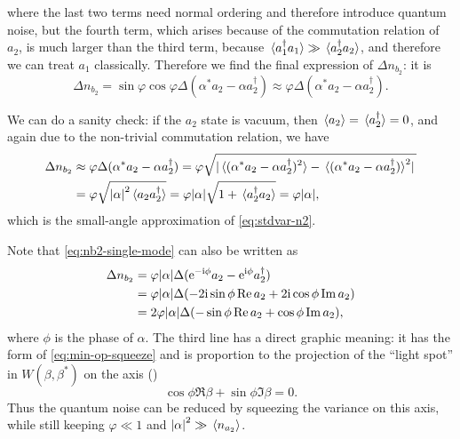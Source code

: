\documentclass[hyperref, a4paper]{article}
\newcommand*{\ii}{\mathrm{i}}
\newcommand*{\ee}{\mathrm{e}}
\begin{document}
where the last two terms need normal ordering and therefore introduce quantum noise,
but the fourth term, which arises because of the commutation relation of $a_2$, 
is much larger than the third term,
because $\expval*{a_1^\dagger a_1} \gg \expval*{a_2^\dagger a_2}$,
and therefore we can treat $a_1$ classically.
Therefore we find the final expression of $\Delta n_{b_2}$: 
it is 
\begin{equation}
    \Delta n_{b_2} = \sin \varphi \cos \varphi \Delta (\alpha^* a_2 - \alpha a_2^\dagger)
    \approx \varphi \Delta (\alpha^* a_2 - \alpha a_2^\dagger).
    \label{eq:nb2-single-mode}
\end{equation}

We can do a sanity check:
if the $a_2$ state is vacuum,
then $\expval*{a_2} = \expval*{a_2^\dagger} = 0$, 
and again due to the non-trivial commutation relation, we have 
\begin{equation}
    \begin{aligned}
        \Delta n_{b_2} &\approx \varphi \Delta (\alpha^* a_2 - \alpha a_2^\dagger)
        = \varphi \sqrt{ \abs*{\expval*{ (\alpha^* a_2 - \alpha a_2^\dagger)^2 } 
        - \expval*{(\alpha^* a_2 - \alpha a_2^\dagger)}^2} } \\
        &= \varphi \sqrt{
            \abs{\alpha}^2 \expval*{a_2 a_2^\dagger}
        } 
        = \varphi \abs{\alpha} \sqrt{ 1 + \expval*{a^\dagger_2 a_2} } = \varphi \abs{\alpha},
    \end{aligned}
\end{equation}
which is the small-angle approximation of \eqref{eq:stdvar-n2}.

Note that \eqref{eq:nb2-single-mode} can also be written as  
\begin{equation}
    \begin{aligned}
        \Delta n_{b_2} &= \varphi \abs{\alpha} \Delta (\ee^{- \ii \phi} a_2 - \ee^{\ii \phi} a_2^\dagger)  \\
        &= \varphi \abs{\alpha} \Delta ( - 2 \ii \sin \phi \Re a_2 + 2 \ii \cos \phi \Im a_2 ) \\
        &= 2 \varphi \abs{\alpha} \Delta (- \sin \phi \Re a_2 + \cos \phi \Im a_2 ),
    \end{aligned}
    \label{eq:nb2-axis}
\end{equation}
where $\phi$ is the phase of $\alpha$.
The third line has a direct graphic meaning:
it has the form of \eqref{eq:min-op-squeeze}
and is proportion to the projection of the ``light spot'' in $W(\beta, \beta^*)$
on the axis ()
\begin{equation}
    \cos \phi \Re \beta + \sin \phi \Im \beta = 0.
    \label{eq:measure-axis}
\end{equation}
Thus the quantum noise can be reduced by squeezing the variance on this axis,
while still keeping $\varphi \ll 1$ and 
$\abs{\alpha}^2 \gg \expval*{n_{a_2}}$.
\end{document}
